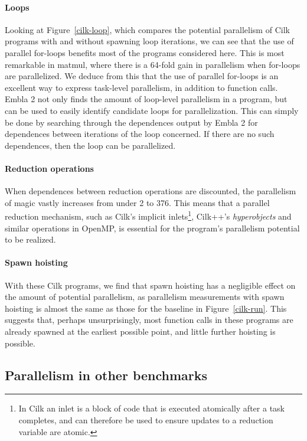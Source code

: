 \paragraph{Loops}

Looking at Figure~\ref{cilk-loop}, which compares the potential parallelism of Cilk programs with and without spawning loop iterations, we can see that the use of parallel for-loops benefits most of the programs considered here.
This is most remarkable in \textsf{matmul}, where there is a 64-fold gain in parallelism when for-loops are parallelized.
We deduce from this that the use of parallel for-loops is an excellent way to express task-level parallelism, in addition to function calls.
Embla 2 not only finds the amount of loop-level parallelism in a program, but can be used to easily identify candidate loops for parallelization.
This can simply be done by searching through the dependences output by Embla 2 for dependences between iterations of the loop concerned.
If there are no such dependences, then the loop can be parallelized.

\paragraph{Reduction operations}

When dependences between reduction operations are discounted,
the parallelism of \textsf{magic} vastly increases from under 2 to 376.
This means that a parallel reduction mechanism, such as Cilk's implicit inlets\footnote{In Cilk an inlet is a block of code that is executed atomically after a task completes, and can therefore be used to ensure updates to a reduction variable are atomic.}, Cilk++'s \emph{hyperobjects} and similar operations in OpenMP,
is essential for the program's parallelism potential to be realized.

\paragraph{Spawn hoisting}

With these Cilk programs, we find that spawn hoisting has a negligible effect on the amount of potential parallelism, as parallelism measurements with spawn hoisting is almost the same as those for the baseline in Figure~\ref{cilk-run}.
This suggests that, perhaps unsurprisingly, most function calls in these programs are already spawned at the earliest possible point, and little further hoisting is possible.

\subsection{Parallelism in other benchmarks} \label{sresults:benchmarks}

